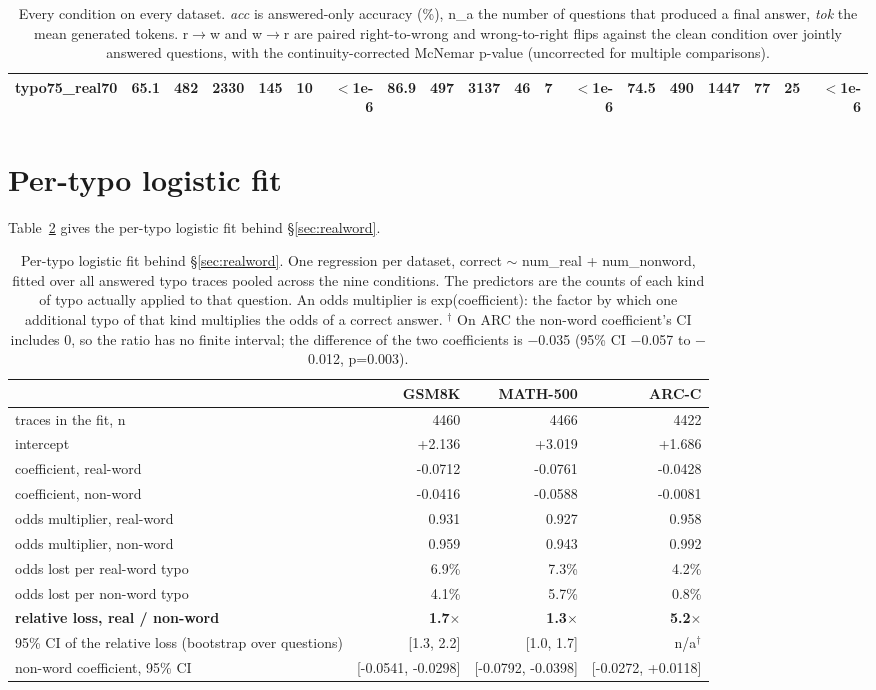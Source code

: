 \documentclass[11pt]{article}
\begin{document}
\begin{table}[t]
{\begin{tabular}{lrrrrrrrrrrrrrrrrrr}
typo75\_real70 & 65.1 & 482 & 2330 & 145 & 10 & $<$1e-6 & 86.9 & 497 & 3137 & 46 & 7 & $<$1e-6 & 74.5 & 490 & 1447 & 77 & 25 & $<$1e-6 \\
\bottomrule
\end{tabular}}
\caption{Every condition on every dataset. \emph{acc} is answered-only accuracy (\%), n\_a the number of questions that produced a final answer, \emph{tok} the mean generated tokens. r$\rightarrow$w and w$\rightarrow$r are paired right-to-wrong and wrong-to-right flips against the clean condition over jointly answered questions, with the continuity-corrected McNemar p-value (uncorrected for multiple comparisons).}
\label{tab:4}
\end{table}


\section{Per-typo logistic fit}

Table~\ref{tab:5} gives the per-typo logistic fit behind \S\ref{sec:realword}.

\begin{table}[t]
\centering
\small
\begin{tabular}{lrrr}
\toprule
 & \textbf{GSM8K} & \textbf{MATH-500} & \textbf{ARC-C} \\
\midrule
traces in the fit, n & 4460 & 4466 & 4422 \\
intercept & +2.136 & +3.019 & +1.686 \\
coefficient, real-word & -0.0712 & -0.0761 & -0.0428 \\
coefficient, non-word & -0.0416 & -0.0588 & -0.0081 \\
odds multiplier, real-word & 0.931 & 0.927 & 0.958 \\
odds multiplier, non-word & 0.959 & 0.943 & 0.992 \\
odds lost per real-word typo & 6.9\% & 7.3\% & 4.2\% \\
odds lost per non-word typo & 4.1\% & 5.7\% & 0.8\% \\
\textbf{relative loss, real / non-word} & \textbf{1.7$\times$} & \textbf{1.3$\times$} & \textbf{5.2$\times$} \\
95\% CI of the relative loss (bootstrap over questions) & [1.3, 2.2] & [1.0, 1.7] & n/a$^\dagger$ \\
non-word coefficient, 95\% CI & [-0.0541, -0.0298] & [-0.0792, -0.0398] & [-0.0272, +0.0118] \\
\bottomrule
\end{tabular}
\caption{Per-typo logistic fit behind \S\ref{sec:realword}. One regression per dataset, correct $\sim$ num\_real + num\_nonword, fitted over all answered typo traces pooled across the nine conditions. The predictors are the counts of each kind of typo actually applied to that question. An odds multiplier is exp(coefficient): the factor by which one additional typo of that kind multiplies the odds of a correct answer. $^\dagger$ On ARC the non-word coefficient's CI includes 0, so the ratio has no finite interval; the difference of the two coefficients is $-$0.035 (95\% CI $-$0.057 to $-$0.012, p=0.003).}
\label{tab:5}
\end{table}
\end{document}
